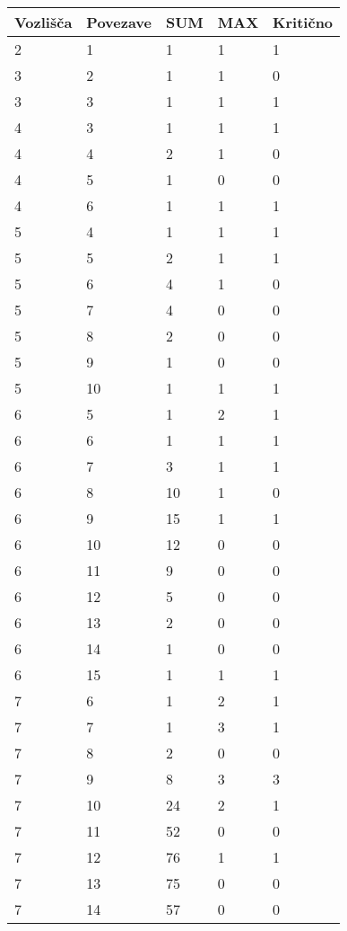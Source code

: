 \documentclass[fin1, tisk]{fmfdelo}
\begin{document}
\begin{table}[h]
    \centering
    \scriptsize
    \begin{tabular}{lllll}
        Vozlišča & Povezave & SUM & MAX & Kritično \\ 
        \hline
        2 & 1 & 1 & 1 & 1 \\ 
        3 & 2 & 1 & 1 & 0 \\ 
        3 & 3 & 1 & 1 & 1 \\ 
        4 & 3 & 1 & 1 & 1 \\ 
        4 & 4 & 2 & 1 & 0 \\ 
        4 & 5 & 1 & 0 & 0 \\ 
        4 & 6 & 1 & 1 & 1 \\ 
        5 & 4 & 1 & 1 & 1 \\ 
        5 & 5 & 2 & 1 & 1 \\ 
        5 & 6 & 4 & 1 & 0 \\ 
        5 & 7 & 4 & 0 & 0 \\ 
        5 & 8 & 2 & 0 & 0 \\ 
        5 & 9 & 1 & 0 & 0 \\ 
        5 & 10 & 1 & 1 & 1 \\ 
        6 & 5 & 1 & 2 & 1 \\ 
        6 & 6 & 1 & 1 & 1 \\ 
        6 & 7 & 3 & 1 & 1 \\ 
        6 & 8 & 10 & 1 & 0 \\ 
        6 & 9 & 15 & 1 & 1 \\ 
        6 & 10 & 12 & 0 & 0 \\ 
        6 & 11 & 9 & 0 & 0 \\ 
        6 & 12 & 5 & 0 & 0 \\ 
        6 & 13 & 2 & 0 & 0 \\ 
        6 & 14 & 1 & 0 & 0 \\ 
        6 & 15 & 1 & 1 & 1 \\ 
        7 & 6 & 1 & 2 & 1 \\ 
        7 & 7 & 1 & 3 & 1 \\ 
        7 & 8 & 2 & 0 & 0 \\ 
        7 & 9 & 8 & 3 & 3 \\ 
        7 & 10 & 24 & 2 & 1 \\ 
        7 & 11 & 52 & 0 & 0 \\ 
        7 & 12 & 76 & 1 & 1 \\ 
        7 & 13 & 75 & 0 & 0 \\ 
        7 & 14 & 57 & 0 & 0 \\ 

\end{tabular}
\end{table}
\end{document}
